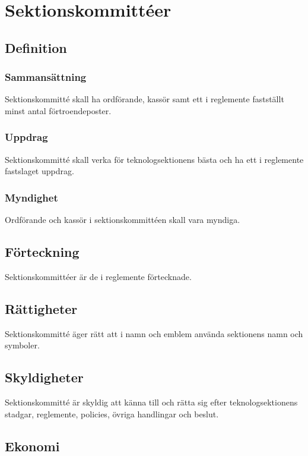 \section{Sektionskommittéer}

\subsection{Definition}

\subsubsection{Sammansättning}
Sektionskommitté skall ha ordförande, kassör samt ett i reglemente fastställt minst antal förtroendeposter.

\subsubsection{Uppdrag}
Sektionskommitté skall verka för teknologsektionens bästa och ha ett i reglemente fastslaget uppdrag.

\subsubsection{Myndighet}
Ordförande och kassör i sektionskommittéen skall vara myndiga.

\subsection{Förteckning}

Sektionskommittéer är de i reglemente förtecknade.

\subsection{Rättigheter}

Sektionskommitté äger rätt att i namn och emblem använda sektionens namn och symboler.

\subsection{Skyldigheter}

Sektionskommitté är skyldig att känna till och rätta sig efter teknologsektionens stadgar, reglemente, policies, övriga handlingar och beslut.

\subsection{Ekonomi}
